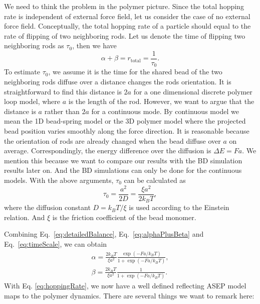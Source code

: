 We need to think the problem in the polymer picture. Since the total hopping rate is independent of external force field, let us consider the case of no external force field.  
Conceptually, the total hopping rate of a particle should equal to the rate of flipping of two neighboring rods. Let us denote the time of flipping two neighboring rods as $\tau_0$, then we have
\begin{equation}
    \label{eq:alphaPlusBeta}
    \alpha + \beta = r_{\text{total}} = \frac{1}{\tau_0}.
\end{equation}
To estimate $\tau_0$, we assume it is the time for the shared bead of the two neighboring rods diffuse over a distance changes the rods orientation.  It is straightforward to find this distance is $2a$ for a one dimensional discrete polymer loop model, where $a$ is the length of the rod. However, we want to argue that the distance is $a$ rather than $2a$ for a continuous mode. By continuous model we mean the 1D bead-spring model or the 3D polymer model where the projected bead position varies smoothly along the force direction. It is reasonable because the orientation of rods are already changed when the bead diffuse over $a$ on average. Correspondingly, the energy difference over the diffusion is $\Delta E = Fa$.
We mention this because we want to compare our results with the BD simulation results later on. And the BD simulations can only be done for the continuous models.
With the above arguments, $\tau_0$ can be calculated as
\begin{equation}
    \label{eq:timeScale}
    \tau_0 = \frac{a^2}{2 D} = \frac{\xi a^2}{2k_{B}T},
 \end{equation}
where the diffusion constant $D = k_B T / \xi$ is used according to the Einstein relation. And $\xi$ is the friction coefficient of the bead monomer. 
    
Combining Eq.~\eqref{eq:detailedBalance}, Eq.~\eqref{eq:alphaPlusBeta} and Eq.~\eqref{eq:timeScale}, we can obtain
\begin{subequations}
    \label{eq:hoppingRate}
    \begin{align}
        \alpha  = \frac{2k_B T}{\xi a^2}\frac{\exp{(- Fa/k_B T)}}{1+\exp{(- Fa / k_B T)}}, \\
        \beta  =  \frac{2k_B T}{\xi a^2}\frac{1}{1+\exp{(- Fa / k_B T)}}.
    \end{align}
\end{subequations}
With Eq. \eqref{eq:hoppingRate}, we now have a well defined reflecting ASEP model maps to the polymer dynamics. There are several things we want to remark here: 

